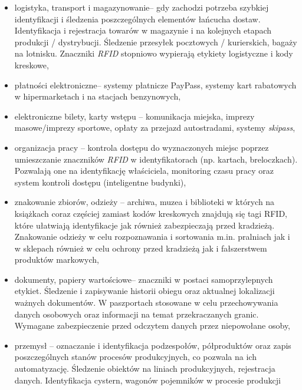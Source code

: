 \begin{itemize}\setlength{\itemsep}{0pt}
	\item logistyka, transport i magazynowanie– gdy zachodzi potrzeba szybkiej identyfikacji i śledzenia poszczególnych elementów łańcucha dostaw. Identyfikacja i rejestracja towarów w magazynie i na kolejnych etapach produkcji / dystrybucji.  Śledzenie przesyłek pocztowych / kurierskich, bagaży na lotnisku.  Znaczniki \emph{RFID} stopniowo wypierają etykiety logistyczne i kody kreskowe,

	\item płatności elektroniczne– systemy płatnicze PayPass, systemy kart rabatowych w hipermarketach i na stacjach benzynowych, 

	\item elektroniczne bilety, karty wstępu – komunikacja miejska, imprezy masowe/imprezy sportowe, opłaty za przejazd autostradami, systemy \emph{skipass},

	\item organizacja pracy – kontrola dostępu do wyznaczonych miejsc poprzez umieszczanie znaczników \emph{RFID} w identyfikatorach (np. kartach, breloczkach). Pozwalają one na identyfikację właściciela, monitoring czasu pracy oraz system kontroli dostępu (inteligentne budynki),

	\item znakowanie zbiorów, odzieży – archiwa, muzea i biblioteki w których na książkach coraz częściej zamiast kodów kreskowych znajdują się tagi RFID, które ułatwiają identyfikacje jak również zabezpieczają przed kradzieżą. Znakowanie odzieży w celu rozpoznawania i sortowania m.in. pralniach jak i w sklepach również w celu ochrony przed kradzieżą jak i fałszerstwem produktów markowych,
 	
 	\item dokumenty, papiery wartościowe– znaczniki w postaci samoprzylepnych etykiet. Śledzenie i zapisywanie historii obiegu oraz aktualnej lokalizacji ważnych dokumentów.  W paszportach stosowane w celu przechowywania danych osobowych oraz informacji na temat przekraczanych granic. Wymagane zabezpieczenie przed odczytem danych przez niepowołane osoby,
	
	\item przemysł – oznaczanie i  identyfikacja podzespołów, półproduktów oraz zapis poszczególnych stanów procesów produkcyjnych, co pozwala na ich automatyzację. Śledzenie obiektów na liniach produkcyjnych, rejestracja danych. Identyfikacja cystern, wagonów pojemników w procesie produkcji
	

\end{itemize}
